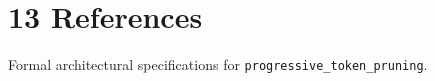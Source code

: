 \section{13 References}

Formal architectural specifications for \texttt{progressive_token_pruning}.
